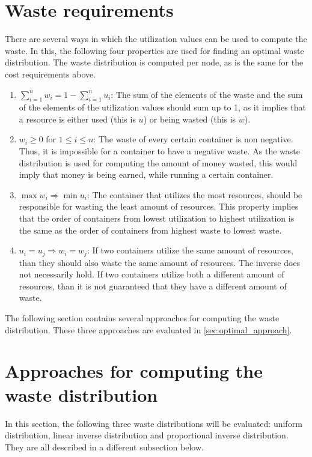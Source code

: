 \section{Waste requirements} \label{sec:waste_requirements}
There are several ways in which the utilization values can be used to compute the waste. In this, the following four properties are used for finding an optimal waste distribution. The waste distribution is computed per node, as is the same for the cost requirements above.
\begin{enumerate}
    \item \textbf{$\sum_{i=1}^n w_i = 1 - \sum_{i=1}^n u_i $}: The sum of the elements of the waste and the sum of the elements of the utilization values should sum up to 1, as it implies that a resource is either used (this is $u$) or being wasted (this is $w$).
    \item \textbf{$w_i \geq 0$} for $1 \leq i \leq n$: The waste of every certain container is non negative. Thus, it is impossible for a container to have a negative waste. As the waste distribution is used for computing the amount of money wasted, this would imply that money is being earned, while running a certain container.
    \item \textbf{$\max w_i \Rightarrow \min u_i$}: The container that utilizes the most resources, should be responsible for wasting the least amount of resources. This property implies that the order of containers from lowest utilization to highest utilization is the same as the order of containers from highest waste to lowest waste. 
    \item \textbf{$u_i = u_j \Rightarrow w_i = w_j $}: If two containers utilize the same amount of resources, than they should also waste the same amount of resources. The inverse does not necessarily hold. If two containers utilize both a different amount of resources, than it is not guaranteed that they have a different amount of waste.
\end{enumerate}

\noindent
The following section contains several approaches for computing the waste distribution. These three approaches are evaluated in \autoref{sec:optimal_approach}.

\section{Approaches for computing the waste distribution} \label{sec:approaches}
In this section, the following three waste distributions will be evaluated: uniform distribution, linear inverse distribution and proportional inverse distribution. They are all described in a different subsection below.

